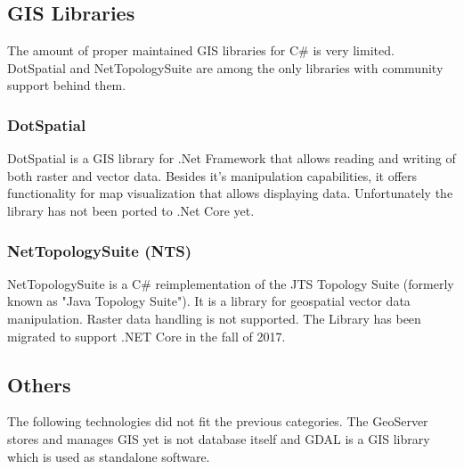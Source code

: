 \subsection{GIS Libraries}
The amount of proper maintained GIS libraries for C\# is very limited. DotSpatial and NetTopologySuite are among the only libraries with community support behind them.

\subsubsection{DotSpatial}
DotSpatial is a GIS library for .Net Framework that allows reading and writing of both raster and vector data. Besides it's manipulation capabilities, it offers functionality for map visualization that allows displaying data. Unfortunately the library has not been ported to .Net Core yet.

\subsubsection{NetTopologySuite (NTS)}
NetTopologySuite is a C\# reimplementation of the JTS Topology Suite (formerly known as "Java Topology Suite"). It is a library for geospatial vector data manipulation. Raster data handling is not supported. The Library has been migrated to support .NET Core in the fall of 2017.


\subsection{Others}
The following technologies did not fit the previous categories. The GeoServer stores and manages GIS yet is not database itself and GDAL is a GIS library which is used as standalone software.

